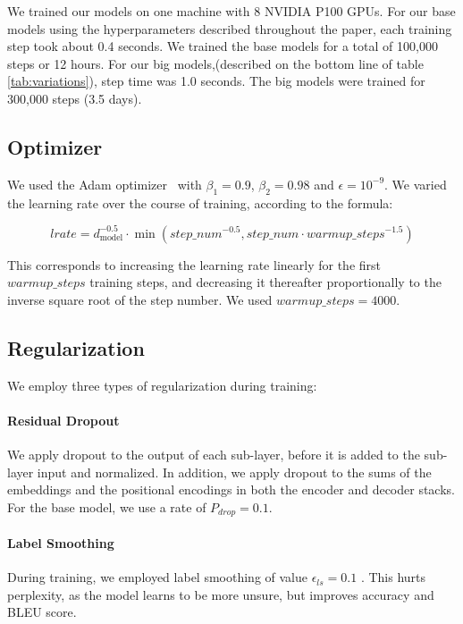 \documentclass{article}
\newcommand{\dmodel}{d_{\text{model}}}
\begin{document}
We trained our models on one machine with 8 NVIDIA P100 GPUs.  For our base models using the hyperparameters described throughout the paper, each training step took about 0.4 seconds.  We trained the base models for a total of 100,000 steps or 12 hours.  For our big models,(described on the bottom line of table \ref{tab:variations}), step time was 1.0 seconds.  The big models were trained for 300,000 steps (3.5 days).

\subsection{Optimizer} We used the Adam optimizer~\citep{kingma2014adam} with $\beta_1=0.9$, $\beta_2=0.98$ and $\epsilon=10^{-9}$.  We varied the learning rate over the course of training, according to the formula:

\begin{equation}
lrate = \dmodel^{-0.5} \cdot
  \min({step\_num}^{-0.5},
    {step\_num} \cdot {warmup\_steps}^{-1.5})
\end{equation}

This corresponds to increasing the learning rate linearly for the first $warmup\_steps$ training steps, and decreasing it thereafter proportionally to the inverse square root of the step number.  We used $warmup\_steps=4000$.

\subsection{Regularization} \label{sec:reg}

We employ three types of regularization during training: 
\paragraph{Residual Dropout} We apply dropout \citep{srivastava2014dropout} to the output of each sub-layer, before it is added to the sub-layer input and normalized.   In addition, we apply dropout to the sums of the embeddings and the positional encodings in both the encoder and decoder stacks.  For the base model, we use a rate of $P_{drop}=0.1$.







\paragraph{Label Smoothing} During training, we employed label smoothing of value $\epsilon_{ls}=0.1$ \citep{DBLP:journals/corr/SzegedyVISW15}.  This hurts perplexity, as the model learns to be more unsure, but improves accuracy and BLEU score.
 
\end{document}
